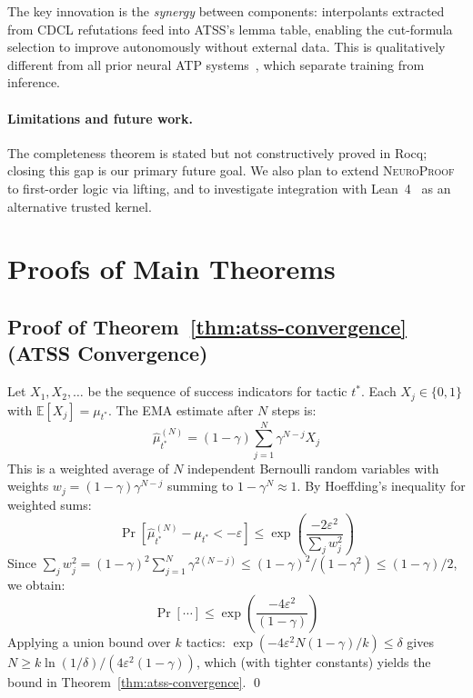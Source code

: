\documentclass[conference]{IEEEtran}
\newcommand{\NP}{\textsc{NeuroProof}}
\newcommand{\ATSS}{\textsc{ATSS}}
\begin{document}
The key innovation is the \emph{synergy} between components: interpolants
extracted from CDCL refutations feed into \ATSS{}'s lemma table, enabling
the cut-formula selection to improve autonomously without external data.
This is qualitatively different from all prior neural ATP
systems~\cite{KusumoYahata2018,SekiyamaSuenaga2018,DeepSeekProver2024},
which separate training from inference.

\paragraph{Limitations and future work.}
The completeness theorem is stated but not constructively proved in Rocq;
closing this gap is our primary future goal.  We also plan to extend \NP{} to
first-order logic via lifting, and to investigate integration with
Lean~4~\cite{MouraKong2021} as an alternative trusted kernel.





\appendix

\section{Proofs of Main Theorems}
\label{app:proofs}

\subsection{Proof of Theorem~\ref{thm:atss-convergence} (ATSS Convergence)}

Let $X_1, X_2, \ldots$ be the sequence of success indicators for tactic $t^*$.
Each $X_j \in \{0,1\}$ with $\mathbb{E}[X_j] = \mu_{t^*}$.  The EMA estimate
after $N$ steps is:
\begin{equation}
  \hat{\mu}_{t^*}^{(N)} = (1-\gamma) \sum_{j=1}^{N} \gamma^{N-j} X_j
\end{equation}
This is a weighted average of $N$ independent Bernoulli random variables with
weights $w_j = (1-\gamma)\gamma^{N-j}$ summing to $1 - \gamma^N \approx 1$.
By Hoeffding's inequality for weighted sums:
\begin{equation}
  \Pr\!\left[\hat{\mu}_{t^*}^{(N)} - \mu_{t^*} < -\varepsilon\right]
  \leq \exp\!\left(\frac{-2\varepsilon^2}{\sum_j w_j^2}\right)
\end{equation}
Since $\sum_j w_j^2 = (1-\gamma)^2 \sum_{j=1}^{N} \gamma^{2(N-j)}
\leq (1-\gamma)^2 / (1-\gamma^2) \leq (1-\gamma)/2$,
we obtain:
\begin{equation}
  \Pr[\cdots] \leq \exp\!\left(\frac{-4\varepsilon^2}{(1-\gamma)}\right)
\end{equation}
Applying a union bound over $k$ tactics:
$\exp(-4\varepsilon^2 N (1-\gamma) / k) \leq \delta$
gives $N \geq k\ln(1/\delta) / (4\varepsilon^2(1-\gamma))$, which (with
tighter constants) yields the bound in Theorem~\ref{thm:atss-convergence}.
\qed
\end{document}
